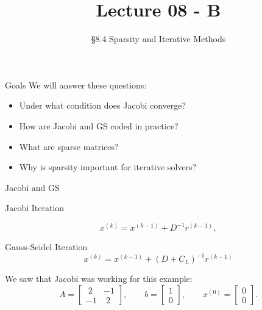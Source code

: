 \documentclass[10pt]{beamer}
\title[Math/CS 375]{Lecture 08 - B}
\subtitle{\S 8.4 Sparsity and Iterative Methods}
\begin{document}
\begin{frame}
  \titlepage
\end{frame}
\begin{frame}{Goals}
We will answer these questions:\\[3mm]
\begin{itemize}
    \item Under what condition does Jacobi converge?
    \item How are Jacobi and GS coded in practice?
    \item What are sparse matrices?
    \item Why is sparsity important for iterative solvers?
\end{itemize}
\end{frame}

\begin{frame}{Jacobi and GS}

\begin{block}{Jacobi Iteration}
    
$$
x^{(k)} = x^{(k-1)} + D^{-1}r^{(k-1)},
$$
\end{block}

\begin{block}{Gauss-Seidel Iteration}
$$
x^{(k)} = x^{(k-1)} + (D+C_L)^{-1}r^{(k-1)}
$$
\end{block}


\begin{example}
We saw that Jacobi was working for this example:
\[
A=\begin{bmatrix}
\;2 & -1\\
-1 & \;2
\end{bmatrix},
\qquad
b=\begin{bmatrix}
1\\[2pt] 0
\end{bmatrix},
\qquad
x^{(0)}=\begin{bmatrix}
0\\[2pt] 0
\end{bmatrix}.
\]
\end{example}


\end{frame}

\end{document}
